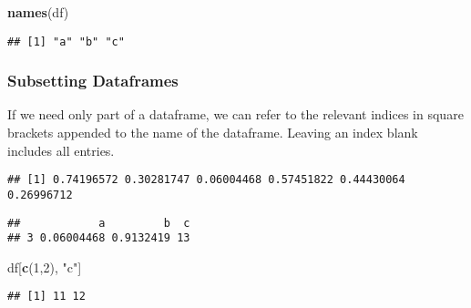 \documentclass[11pt,]{article}
\newenvironment{Shaded}{\begin{snugshade}}{\end{snugshade}}
\newcommand{\KeywordTok}[1]{\textcolor[rgb]{0.13,0.29,0.53}{\textbf{#1}}}
\newcommand{\DecValTok}[1]{\textcolor[rgb]{0.00,0.00,0.81}{#1}}
\newcommand{\StringTok}[1]{\textcolor[rgb]{0.31,0.60,0.02}{#1}}
\newcommand{\CommentTok}[1]{\textcolor[rgb]{0.56,0.35,0.01}{\textit{#1}}}
\newcommand{\OperatorTok}[1]{\textcolor[rgb]{0.81,0.36,0.00}{\textbf{#1}}}
\newcommand{\NormalTok}[1]{#1}
\begin{document}
\begin{Shaded}
\begin{Highlighting}[]
\KeywordTok{names}\NormalTok{(df)}
\end{Highlighting}
\end{Shaded}

\begin{verbatim}
## [1] "a" "b" "c"
\end{verbatim}

\subsubsection{Subsetting Dataframes}\label{subsetting-dataframes}

If we need only part of a dataframe, we can refer to the relevant
indices in square brackets appended to the name of the dataframe.
Leaving an index blank includes all entries.

\begin{Shaded}
\end{Shaded}

\begin{verbatim}
## [1] 0.74196572 0.30281747 0.06004468 0.57451822 0.44430064 0.26996712
\end{verbatim}

\begin{Shaded}
\end{Shaded}

\begin{verbatim}
##            a         b  c
## 3 0.06004468 0.9132419 13
\end{verbatim}

\begin{Shaded}
\begin{Highlighting}[]
\NormalTok{df[}\KeywordTok{c}\NormalTok{(}\DecValTok{1}\NormalTok{,}\DecValTok{2}\NormalTok{), }\StringTok{"c"}\NormalTok{]}
\end{Highlighting}
\end{Shaded}

\begin{verbatim}
## [1] 11 12
\end{verbatim}
\end{document}
